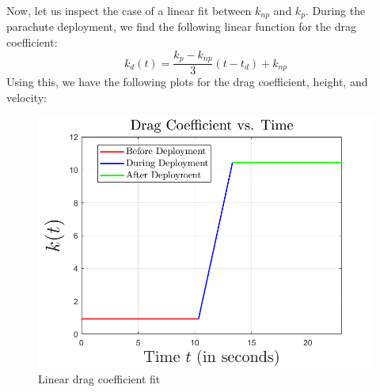 \documentclass{article}
\begin{document}
    Now, let us inspect the case of a linear fit between $k_{np}$ and $k_p$. During the parachute deployment, we find the following linear function for the drag coefficient:
    \[k_d(t) = \frac{k_p - k_{np}}{3}(t - t_d) + k_{np}\]
    Using this, we have the following plots for the drag coefficient, height, and velocity:
    \begin{figure}[H]
        \centering
        \includegraphics[scale = 0.45]{linearkplot}
        \caption{Linear drag coefficient fit}
    \end{figure}
    
\end{document}
